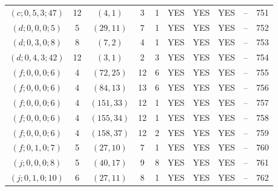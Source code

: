 \begin{longtable}{|c|c|c|c|c|c|c|c|c|c|}
$(c; 0, 5, 3; 47)$ & 12 & $(4, 1)$ & 3 & 1 & YES & YES & YES & -- & 751\\
$(d; 0, 0, 0; 5)$ & 5 & $(29, 11)$ & 7 & 1 & YES & YES & YES & -- & 752\\
$(d; 0, 3, 0; 8)$ & 8 & $(7, 2)$ & 4 & 1 & YES & YES & YES & -- & 753\\
$(d; 0, 4, 3; 42)$ & 12 & $(3, 1)$ & 2 & 3 & YES & YES & YES & -- & 754\\
$(f; 0, 0, 0; 6)$ & 4 & $(72, 25)$ & 12 & 6 & YES & YES & YES & -- & 755\\
$(f; 0, 0, 0; 6)$ & 4 & $(84, 13)$ & 13 & 6 & YES & YES & YES & -- & 756\\
$(f; 0, 0, 0; 6)$ & 4 & $(151, 33)$ & 12 & 1 & YES & YES & YES & -- & 757\\
$(f; 0, 0, 0; 6)$ & 4 & $(155, 34)$ & 12 & 1 & YES & YES & YES & -- & 758\\
$(f; 0, 0, 0; 6)$ & 4 & $(158, 37)$ & 12 & 2 & YES & YES & YES & -- & 759\\
$(f; 0, 1, 0; 7)$ & 5 & $(27, 10)$ & 7 & 1 & YES & YES & YES & -- & 760\\
$(j; 0, 0, 0; 8)$ & 5 & $(40, 17)$ & 9 & 8 & YES & YES & YES & -- & 761\\
$(j; 0, 1, 0; 10)$ & 6 & $(27, 11)$ & 8 & 1 & YES & YES & YES & -- & 762
\end{longtable}
